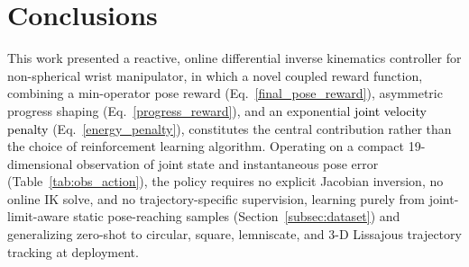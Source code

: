 \documentclass[preprint,12pt]{elsarticle}
\begin{document}





\section{Conclusions}
\label{conclusion}
This work presented a reactive, online differential inverse kinematics
controller for non-spherical wrist manipulator, in which a novel coupled
reward function, combining a min-operator pose reward (Eq.~\eqref{final_pose_reward}), asymmetric
progress shaping (Eq.~\eqref{progress_reward}), and an exponential \textcolor{black}{joint velocity penalty} (Eq.~\eqref{energy_penalty}),
constitutes the central contribution rather than the choice of reinforcement
learning algorithm. Operating on a compact 19-dimensional observation of
joint state and instantaneous pose error (Table~\ref{tab:obs_action}), the policy requires no explicit Jacobian inversion, no online IK solve, and no trajectory-specific supervision, learning purely from joint-limit-aware static pose-reaching samples (Section~\ref{subsec:dataset}) and generalizing zero-shot to circular, square, lemniscate, and 3-D Lissajous trajectory tracking at deployment.
\end{document}
